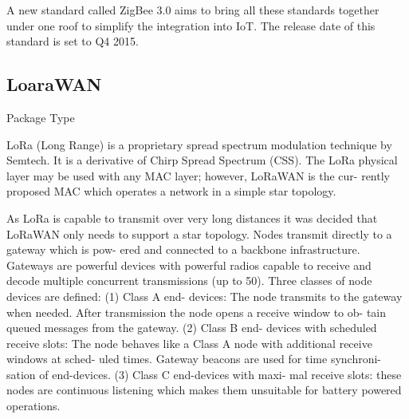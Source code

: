 A new standard called ZigBee 3.0 aims to bring all these standards together under one roof to simplify the integration into IoT.
The release date of this standard is set to Q4 2015.

\subsection{LoaraWAN}

Package Type

LoRa (Long Range) is a proprietary spread spectrum
modulation technique by Semtech. It is a derivative of Chirp
Spread Spectrum (CSS). The LoRa physical layer may be
used with any MAC layer; however, LoRaWAN is the cur-
rently proposed MAC which operates a network in a simple
star topology. 

As LoRa is capable to transmit over very long distances
it was decided that LoRaWAN only needs to support a star
topology. Nodes transmit directly to a gateway which is pow-
ered and connected to a backbone infrastructure. Gateways
are powerful devices with powerful radios capable to receive
and decode multiple concurrent transmissions (up to 50).
Three classes of node devices are defined: (1) Class A end-
devices: The node transmits to the gateway when needed.
After transmission the node opens a receive window to ob-
tain queued messages from the gateway. (2) Class B end-
devices with scheduled receive slots: The node behaves like
a Class A node with additional receive windows at sched-
uled times. Gateway beacons are used for time synchroni-
sation of end-devices. (3) Class C end-devices with maxi-
mal receive slots: these nodes are continuous listening which
makes them unsuitable for battery powered operations.

\clearpage

